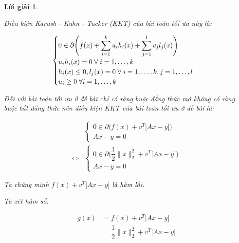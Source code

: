\documentclass[14pt, a4paper]{article}
\theoremstyle{sltheorem}
\theoremstyle{soltheorem}
\newtheorem*{loigiai}{Lời giải}
\begin{document}
\begin{loigiai}
\begin{enumerate} [wide, labelwidth=!, labelindent=0pt,label=\textbf{\arabic*}.]
            Điều kiện Karush - Kuhn - Tucker (KKT) của bài toán tối ưu này là:

            \begin{equation*}
                \begin{cases}
                    0 \in \partial \Bigg( f(x) + \displaystyle\sum_{i=1}^k u_i h_i(x) + \displaystyle\sum_{j=1}^l v_j l_j(x) \Bigg) \\
                    u_i h_i(x) = 0 \thickspace \forall \thickspace i = 1, \dots, k \\
                    h_i(x) \leq 0, l_j(x) = 0 \thickspace \forall \thickspace i=1, \dots, k, j=1, \dots, l \\
                    u_i \geq 0 \thickspace \forall i = 1, \dots, k
                \end{cases}
            \end{equation*}

            Đối với bài toán tối ưu ở đề bài chỉ có ràng buộc đẳng thức mà không có ràng buộc bất đẳng thức nên điều kiện KKT của bài toán tối ưu ở đề bài là:

            \begin{equation*}
                \begin{aligned}
                &\begin{cases}
                    0 \in \partial \Big ( f(x) + v^T\Big \lbrack Ax - y \Big \rbrack \Big) \\ Ax - y = 0
                \end{cases}\\
                \Leftrightarrow & \begin{cases} 0 \in \partial \Big( \dfrac{1}{2} \lVert x \rVert_2^2 + v^T\Big \lbrack Ax - y \Big \rbrack \Big) \\ Ax - y = 0 \end{cases}
                \end{aligned}
            \end{equation*}

            Ta chứng minh $f(x) + v^T\Big \lbrack Ax - y \Big \rbrack$ là hàm lồi.

            Ta xét hàm số:

            \begin{equation*}
                \begin{aligned}
                    g(x) &= f(x) + v^T\Big \lbrack Ax - y \Big \rbrack \\
                    &=\dfrac{1}{2} \lVert x \rVert_2^2 + v^T\Big \lbrack Ax - y \Big \rbrack
                \end{aligned}
            \end{equation*}


\end{enumerate}
\end{loigiai}
\end{document}
